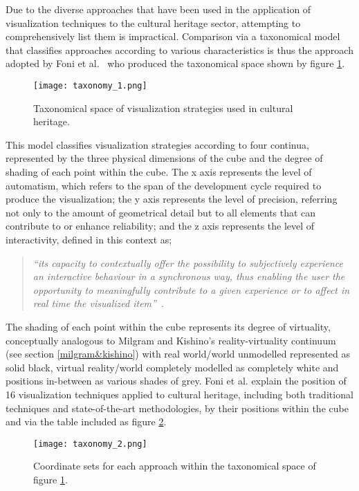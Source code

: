 Due to the diverse approaches that have been used in the application of visualization techniques to the cultural heritage sector, attempting to comprehensively list them is impractical. Comparison via a taxonomical model that classifies approaches according to various characteristics is thus the approach adopted by Foni et al.~\cite{Foni2010} who produced the taxonomical space shown by figure \ref{taxonomy_1.png}.

\begin{figure}[h]
\centering
  \texttt{[image: taxonomy\_1.png]}
  \caption{Taxonomical space of visualization strategies used in cultural heritage.}
  \label{taxonomy_1.png}
\end{figure}

This model classifies visualization strategies according to four continua, represented by the three physical dimensions of the cube and the degree of shading of each point within the cube. The x axis represents the level of automatism, which refers to the span of the development cycle required to produce the visualization; the y axis represents the level of precision, referring not only to the amount of geometrical detail but to all elements that can contribute to or enhance reliability; and the z axis represents the level of interactivity, defined in this context as;

\begin{quote}
	\textit{``its capacity to contextually offer the possibility to subjectively experience an interactive behaviour in a synchronous way, thus enabling the user the opportunity to meaningfully contribute to a given experience or to affect in real time the visualized  item''}~\cite{Foni2010}.
\end{quote}

The shading of each point within the cube represents its degree of virtuality, conceptually analogous to Milgram and Kishino's reality-virtuality continuum (see section \ref{milgram&kishino}) with real world/world unmodelled represented as solid black, virtual reality/world completely modelled as completely white and positions in-between as various shades of grey. Foni et al. explain the position of 16 visualization techniques applied to cultural heritage, including both traditional techniques and state-of-the-art methodologies, by their positions within the cube and via the table included as figure \ref{taxonomy_2.png}.

\begin{figure}[h]
\centering
  \texttt{[image: taxonomy\_2.png]}
  \caption{Coordinate sets for each approach within the taxonomical space of figure \ref{taxonomy_1.png}.}
  \label{taxonomy_2.png}
\end{figure}

